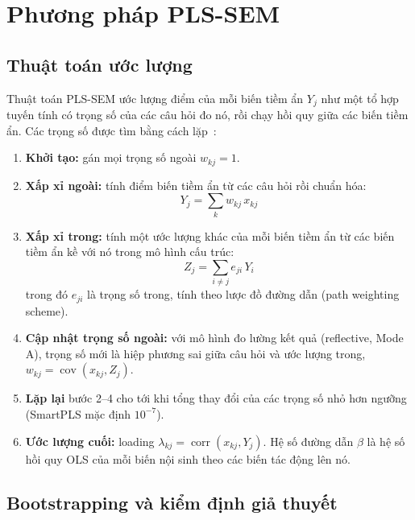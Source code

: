 \section{Phương pháp PLS-SEM}
\label{sec:pls-sem}

\subsection{Thuật toán ước lượng}

Thuật toán PLS-SEM ước lượng điểm của mỗi biến tiềm ẩn $Y_j$ như một tổ hợp tuyến tính có trọng số của các câu hỏi đo nó, rồi chạy hồi quy giữa các biến tiềm ẩn. Các trọng số được tìm bằng cách lặp~\cite{hair2022primer,tenenhaus2005}:
\begin{enumerate}
  \item \textbf{Khởi tạo:} gán mọi trọng số ngoài $w_{kj} = 1$.
  \item \textbf{Xấp xỉ ngoài:} tính điểm biến tiềm ẩn từ các câu hỏi rồi chuẩn hóa:
  \begin{equation}
  Y_j = \sum_{k} w_{kj}\, x_{kj}
  \label{eq:xap-xi-ngoai}
  \end{equation}
  \item \textbf{Xấp xỉ trong:} tính một ước lượng khác của mỗi biến tiềm ẩn từ các biến tiềm ẩn kề với nó trong mô hình cấu trúc:
  \begin{equation}
  Z_j = \sum_{i \neq j} e_{ji}\, Y_i
  \label{eq:xap-xi-trong}
  \end{equation}
  trong đó $e_{ji}$ là trọng số trong, tính theo lược đồ đường dẫn (path weighting scheme).
  \item \textbf{Cập nhật trọng số ngoài:} với mô hình đo lường kết quả (reflective, Mode A), trọng số mới là hiệp phương sai giữa câu hỏi và ước lượng trong, $w_{kj} = \operatorname{cov}(x_{kj}, Z_j)$.
  \item \textbf{Lặp lại} bước 2--4 cho tới khi tổng thay đổi của các trọng số nhỏ hơn ngưỡng (SmartPLS mặc định $10^{-7}$).
  \item \textbf{Ước lượng cuối:} loading $\lambda_{kj} = \operatorname{corr}(x_{kj}, Y_j)$. Hệ số đường dẫn $\beta$ là hệ số hồi quy OLS của mỗi biến nội sinh theo các biến tác động lên nó.
\end{enumerate}

\subsection{Bootstrapping và kiểm định giả thuyết}

